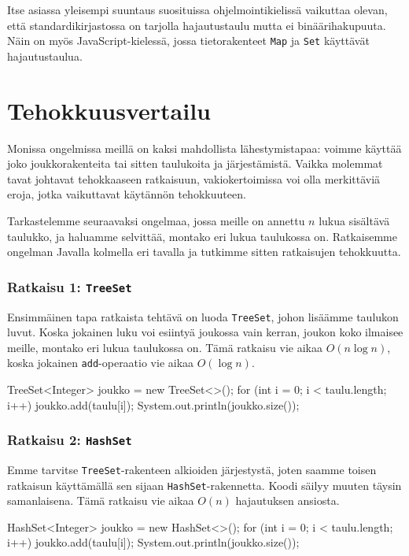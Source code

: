 Itse asiassa yleisempi suuntaus suosituissa ohjelmointikielissä vaikuttaa olevan,
että standardikirjastossa on tarjolla hajautustaulu mutta ei
binääri\-hakupuuta. Näin on myös JavaScript-kielessä,
jossa tietorakenteet \texttt{Map} ja \texttt{Set} käyttävät hajautustaulua.

\section{Tehokkuusvertailu}

Monissa ongelmissa meillä on kaksi mahdollista lähestymistapaa:
voimme käyttää joko joukkorakenteita tai sitten taulukoita ja järjestämistä.
Vaikka molemmat tavat johtavat tehokkaaseen ratkaisuun,
vakiokertoimissa voi olla merkittäviä eroja, jotka vaikuttavat
käytännön tehokkuuteen.

Tarkastelemme seuraavaksi ongelmaa, jossa meille on annettu
$n$ lukua sisältävä taulukko, ja haluamme selvittää,
montako eri lukua taulukossa on.
Ratkaisemme ongelman Javalla kolmella eri tavalla ja tutkimme sitten
ratkaisujen tehokkuutta.

\subsubsection{Ratkaisu 1: \texttt{TreeSet}}

Ensimmäinen tapa ratkaista tehtävä on luoda \texttt{TreeSet},
johon lisäämme taulukon luvut.
Koska jokainen luku voi esiintyä joukossa vain kerran,
joukon koko ilmaisee meille, montako eri lukua taulukossa on.
Tämä ratkaisu vie aikaa $O(n \log n)$, koska jokainen
\texttt{add}-operaatio vie aikaa $O(\log n)$.

\begin{code}
TreeSet<Integer> joukko = new TreeSet<>();
for (int i = 0; i < taulu.length; i++) {
    joukko.add(taulu[i]);
}
System.out.println(joukko.size());
\end{code}

\subsubsection{Ratkaisu 2: \texttt{HashSet}}

Emme tarvitse \texttt{TreeSet}-rakenteen
alkioiden järjestystä, joten saamme toisen ratkaisun
käyttämällä sen sijaan \texttt{HashSet}-rakennetta.
Koodi säilyy muuten täysin samanlaisena.
Tämä ratkaisu vie aikaa $O(n)$ hajautuksen ansiosta.

\begin{code}
HashSet<Integer> joukko = new HashSet<>();
for (int i = 0; i < taulu.length; i++) {
    joukko.add(taulu[i]);
}
System.out.println(joukko.size());
\end{code}


